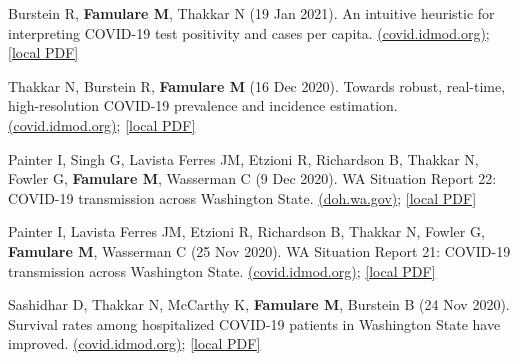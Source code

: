 \documentclass{article}
\begin{document}
\begin{llist}
\begin{items}
	\item[{[44]}] Burstein R, \textbf{Famulare M}, Thakkar N (19 Jan 2021). An intuitive heuristic for interpreting COVID-19 test positivity and cases per capita. \href{https://iazpvnewgrp01.blob.core.windows.net/source/2021-03/reports/pdf/An_intuitive_heuristic_for_interpreting_COVID-19_test_positivity_and_cases_per_capita.pdf}{(covid.idmod.org)}; \href{https://famulare.github.io/assets/publication-mirror/An_intuitive_heuristic_for_interpreting_COVID-19_test_positivity_and_cases_per_capita.pdf}{[local PDF]}
	
	\item[{[43]}] Thakkar N, Burstein R, \textbf{Famulare M} (16 Dec 2020). Towards robust, real-time, high-resolution COVID-19 prevalence and incidence estimation. \href{https://iazpvnewgrp01.blob.core.windows.net/source/2021-02/reports/pdf/Towards_robust_real_time_high_resolution_COVID_19_prevalence_and_incidence_estimation.pdf}{(covid.idmod.org)}; \href{https://famulare.github.io/assets/publication-mirror/Towards_robust_real_time_high_resolution_COVID_19_prevalence_and_incidence_estimation.pdf}{[local PDF]}
	
	\item[{[42]}] Painter I, Singh G, Lavista Ferres JM, Etzioni R, Richardson B, Thakkar N, Fowler G, \textbf{Famulare M}, Wasserman C (9 Dec 2020). WA Situation Report 22: COVID-19 transmission across Washington State. \href{https://www.doh.wa.gov/Portals/1/Documents/1600/coronavirus/data-tables/WA-COVID19-Situation-Report-820-114.pdf}{(doh.wa.gov)}; \href{https://famulare.github.io/assets/publication-mirror/WA-COVID19-Situation-Report-820-114.pdf}{[local PDF]}
	
	\item[{[41]}] Painter I, Lavista Ferres JM, Etzioni R, Richardson B, Thakkar N, Fowler G, \textbf{Famulare M}, Wasserman C (25 Nov 2020). WA Situation Report 21: COVID-19 transmission across Washington State. \href{https://iazpvnewgrp01.blob.core.windows.net/source/2021-02/reports/pdf/WA_Situation_Report_21_COVID-19_transmission_across_Washington_State.pdf}{(covid.idmod.org)}; \href{https://famulare.github.io/assets/publication-mirror/WA_Situation_Report_21_COVID-19_transmission_across_Washington_State.pdf}{[local PDF]}
	
	\item[{[40]}] Sashidhar D, Thakkar N, McCarthy K, \textbf{Famulare M}, Burstein B (24 Nov 2020). Survival rates among hospitalized COVID-19 patients in Washington State have improved. \href{https://iazpvnewgrp01.blob.core.windows.net/source/2021-02/reports/pdf/WA_Covid_Mortality_Report.pdf}{(covid.idmod.org)}; \href{https://famulare.github.io/assets/publication-mirror/WA_Covid_Mortality_Report.pdf}{[local PDF]}


\end{items}
\end{llist}
\end{document}
